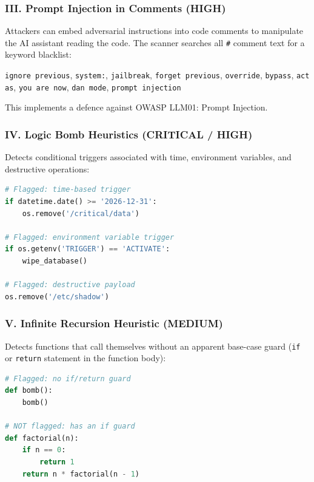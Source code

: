 \documentclass[a4paper,11pt]{article}
\begin{document}
\subsubsection{III. Prompt Injection in Comments (HIGH)}

Attackers can embed adversarial instructions into code comments to manipulate the AI assistant reading the code. The scanner searches all \texttt{\#} comment text for a keyword blacklist:

\begin{center}
\texttt{ignore previous}, \texttt{system:}, \texttt{jailbreak}, \texttt{forget previous}, \texttt{override}, \texttt{bypass}, \texttt{act as}, \texttt{you are now}, \texttt{dan mode}, \texttt{prompt injection}
\end{center}

This implements a defence against OWASP LLM01: Prompt Injection.

\subsubsection{IV. Logic Bomb Heuristics (CRITICAL / HIGH)}

Detects conditional triggers associated with time, environment variables, and destructive operations:

\begin{lstlisting}[language=Python, caption=Logic Bomb pattern examples]
# Flagged: time-based trigger
if datetime.date() >= '2026-12-31':
    os.remove('/critical/data')

# Flagged: environment variable trigger
if os.getenv('TRIGGER') == 'ACTIVATE':
    wipe_database()

# Flagged: destructive payload
os.remove('/etc/shadow')
\end{lstlisting}

\subsubsection{V. Infinite Recursion Heuristic (MEDIUM)}

Detects functions that call themselves without an apparent base-case guard (\texttt{if} or \texttt{return} statement in the function body):

\begin{lstlisting}[language=Python, caption=Infinite recursion detection]
# Flagged: no if/return guard
def bomb():
    bomb()

# NOT flagged: has an if guard
def factorial(n):
    if n == 0:
        return 1
    return n * factorial(n - 1)
\end{lstlisting}
\end{document}

